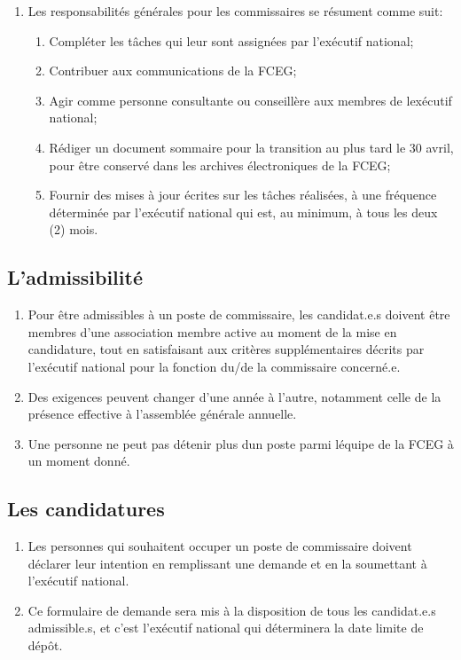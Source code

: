 \begin{enumerate}
 \item
  Les responsabilités générales pour les commissaires se résument comme suit:

  \begin{enumerate}
   \item
    Compléter les tâches qui leur sont assignées par l'exécutif national;
   \item
    Contribuer aux communications de la FCEG;
   \item
    Agir comme personne consultante ou conseillère aux membres de l\textquotesingle exécutif national;
   \item
    Rédiger un document sommaire pour la transition au plus tard le 30 avril, pour être conservé dans les archives électroniques de la FCEG;
   \item
    Fournir des mises à jour écrites sur les tâches réalisées, à une fréquence déterminée par l'exécutif national qui est, au minimum, à tous les deux (2) mois.
  \end{enumerate}
\end{enumerate}

\subsection{L'admissibilité}
\label{l-admissibilite}

\begin{enumerate}
 \item
  Pour être admissibles à un poste de commissaire, les candidat.e.s doivent être membres d'une association membre active au moment de la mise en candidature, tout en satisfaisant aux critères supplémentaires décrits par l'exécutif national pour la fonction du/de la commissaire concerné.e.
 \item
  Des exigences peuvent changer d'une année à l'autre, notamment celle de la présence effective à l'assemblée générale annuelle.
 \item
  Une personne ne peut pas détenir plus d\textquotesingle un poste parmi l\textquotesingle équipe de la FCEG à un moment donné.
\end{enumerate}

\subsection{Les candidatures}
\label{les-candidatures}

\begin{enumerate}
 \item
  Les personnes qui souhaitent occuper un poste de commissaire doivent déclarer leur intention en remplissant une demande et en la soumettant à l'exécutif national.
 \item
  Ce formulaire de demande sera mis à la disposition de tous les candidat.e.s admissible.s, et c'est l'exécutif national qui déterminera la date limite de dépôt.
\end{enumerate}

